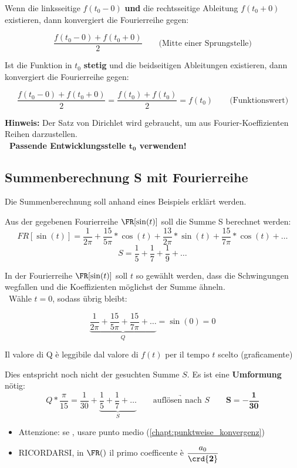 Wenn die linksseitige $f(t_0 - 0)$ \textbf{und} die rechtsseitige Ableitung $f(t_0 + 0)$ existieren, dann konvergiert die Fourierreihe gegen:	

$$ \frac{f(t_0 - 0) + f(t_0 + 0)}{2} \qquad \text{(Mitte einer Sprungstelle)} $$


Ist die Funktion in $t_0$ \textbf{stetig} und die beidseitigen Ableitungen existieren, dann konvergiert die Fourierreihe gegen:	

$$ \frac{f(t_0 - 0) + f(t_0 + 0)}{2} = \frac{f(t_0) + f(t_0)}{2} = f(t_0) \qquad \text{(Funktionswert)} $$

\textbf{Hinweis:}
Der Satz von Dirichlet wird gebraucht, um aus Fourier-Koeffizienten Reihen darzustellen. \\
\textbf{ \textrightarrow\ Passende Entwicklungsstelle $\bm{t_0}$ verwenden!}

\subsection{Summenberechnung S mit Fourierreihe}

Die Summenberechnung soll anhand eines Beispiels erklärt werden.


Aus der gegebenen Fourierreihe $\FR[\sin(t)]$ soll die Summe S berechnet werden:
$$ FR[\sin(t)] = \frac{1}{2\pi} + \frac{15}{5\pi} * \cos(t) + \frac{13}{2\pi} * \sin(t) + \frac{15}{7\pi} * \cos(t) + \ldots $$
$$ S = \frac{1}{5} + \frac{1}{7} + \frac{1}{9} + \ldots $$

In der Fourierreihe $\FR[\sin(t)]$ soll $t$ so gewählt werden, dass die Schwingungen wegfallen und die Koeffizienten möglichst der Summe ähneln. \\
\textrightarrow\ Wähle $t=0$, sodass übrig bleibt:

$$ \underbrace{\frac{1}{2\pi} + \frac{15}{5\pi} + \frac{15}{7\pi} + \ldots}_{Q} = \sin(0) = 0 $$

Il valore di Q è leggibile dal valore di $f(t)$ per il tempo $t$ scelto (graficamente)

Dies entspricht noch nicht der gesuchten Summe $S$. Es ist eine \textbf{Umformung} nötig:
$$ Q * \frac{\pi}{15} = \frac{1}{30} + \underbrace{\frac{1}{5} + \frac{1}{7}+ \ldots}_{S} \qquad \underrightarrow{\text{auflösen nach }S} \qquad
\bm{S = -\frac{1}{30}} $$

\begin{itemize}
    \item Attenzione: se , usare punto medio (\ref{chapt:punktweise_konvergenz})
    \item RICORDARSI, in $\FR()$ il primo coefficente è $\dfrac{a_0}{\crd{\mathbf{2}}}$ 
\end{itemize}




